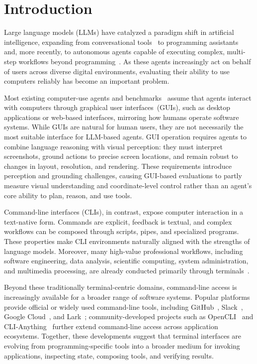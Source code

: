 \documentclass{llmxive}
\begin{document}
\section{Introduction}\label{sec:intro}

Large language models (LLMs) have catalyzed a paradigm shift in artificial intelligence, expanding from conversational tools~\citep{openai2022chatgpt, anthropic2023claude} to programming assistants~\citep{github2021copilot, anysphere2026cursor, openai2025codex, anthropic2026claudecode, opencode2026github, google2025geminicli} and, more recently, to autonomous agents capable of executing complex, multi-step workflows beyond programming~\citep{manus2025launch, openclaw2026}. As these agents increasingly act on behalf of users across diverse digital environments, evaluating their ability to use computers reliably has become an important problem.

Most existing computer-use agents and benchmarks~\citep{zhou2024webarena, xie2024osworld, jia2026osworldmcp} assume that agents interact with computers through graphical user interfaces~(GUIs), such as desktop applications or web-based interfaces, mirroring how humans operate software systems. While GUIs are natural for human users, they are not necessarily the most suitable interface for LLM-based agents. GUI operation requires agents to combine language reasoning with visual perception: they must interpret screenshots, ground actions to precise screen locations, and remain robust to changes in layout, resolution, and rendering. These requirements introduce perception and grounding challenges, causing GUI-based evaluations to partly measure visual understanding and coordinate-level control rather than an agent's core ability to plan, reason, and use tools.

Command-line interfaces (CLIs), in contrast, expose computer interaction in a text-native form. Commands are explicit, feedback is textual, and complex workflows can be composed through scripts, pipes, and specialized programs. These properties make CLI environments naturally aligned with the strengths of language models. Moreover, many high-value professional workflows, including software engineering, data analysis, scientific computing, system administration, and multimedia processing, are already conducted primarily through terminals~\citep{kernighan1979unix,janssens2014data,piccolo2016tools}.

Beyond these traditionally terminal-centric domains, command-line access is increasingly available for a broader range of software systems. Popular platforms provide official or widely used command-line tools, including GitHub~\citep{githubcli}, Slack~\citep{slackcli}, Google Cloud~\citep{gcloudcli}, and Lark~\citep{larksuite_cli}; community-developed projects such as OpenCLI~\citep{opencli2026} and CLI-Anything~\citep{yang2026cli} further extend command-line access across application ecosystems. Together, these developments suggest that terminal interfaces are evolving from programming-specific tools into a broader medium for invoking applications, inspecting state, composing tools, and verifying results.
\end{document}
